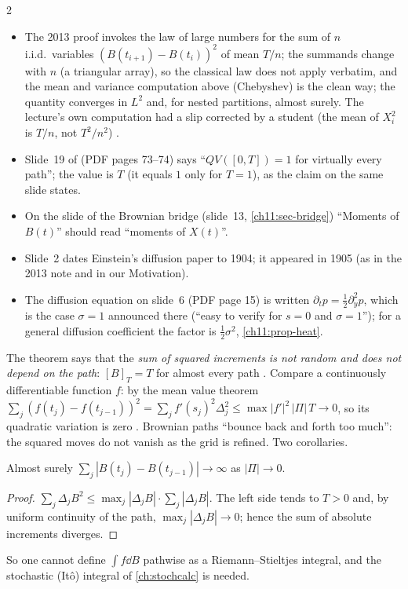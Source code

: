 \begin{paracol}{2}
\begin{coursenote}
\begin{itemize}
  \item The 2013 proof invokes the law of large numbers for the sum of $n$ i.i.d.\ variables $(B(t_{i+1})-B(t_i))^2$ of mean $T/n$; the
      summands change with $n$ (a triangular array), so the classical law does not apply verbatim, and the mean and variance computation above (Chebyshev)
      is the clean way; the quantity converges in $L^2$ and, for nested partitions, almost surely. The lecture's own computation
      had a slip corrected by a student (the mean of $X_i^2$ is $T/n$, not $T^2/n^2$) .
  \item Slide~19 of  (PDF pages 73--74) says ``$QV([0,T])=1$ for virtually every path''; the value is $T$ (it equals $1$ only for $T=1$), as the
      claim on the same slide states.
  \item On the slide of the Brownian bridge (slide~13, \cref{ch11:sec-bridge}) ``Moments of $B(t)$'' should read
      ``moments of $X(t)$''.
  \item Slide~2 dates Einstein's diffusion paper to 1904; it appeared in 1905 (as in the 2013 note and in
      our Motivation).
  \item The diffusion equation on slide~6 (PDF page 15) is written $\partial_tp=\tfrac12\partial_y^2p$, which is the case $\sigma=1$ announced there
      (``easy to verify for $s=0$ and $\sigma=1$''); for a general diffusion coefficient the factor is $\tfrac12\sigma^2$, \cref{ch11:prop-heat}.
\end{itemize}
\end{coursenote}

The theorem says that the \emph{sum of squared increments is not random and does not depend on the path}: $[B]_T=T$ for
almost every path . Compare a continuously differentiable function $f$: by the mean value theorem
$\sum_j(f(t_j)-f(t_{j-1}))^2=\sum_jf'(s_j)^2\Delta_j^2\le\max|f'|^2\,|\Pi|\,T\to0$, so its quadratic variation is zero
. Brownian paths ``bounce back and forth too much'': the squared moves
do not vanish as the grid is refined. Two corollaries.

\begin{corollary}\label{ch11:cor-tv}
Almost surely $\sum_j|B(t_j)-B(t_{j-1})|\to\infty$ as $|\Pi|\to0$.
\end{corollary}
\begin{proof}
$\sum_j\Delta_jB^2\le\max_j|\Delta_jB|\cdot\sum_j|\Delta_jB|$. The left side tends to $T>0$ and, by uniform continuity of the
path, $\max_j|\Delta_jB|\to0$; hence the sum of absolute increments diverges.
\end{proof}
So one cannot define $\int f\dd B$ pathwise as a Riemann--Stieltjes integral, and the stochastic (It\^o) integral of \cref{ch:stochcalc} is needed.


\end{paracol}

